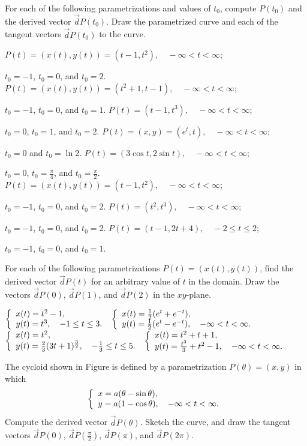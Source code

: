 \begin{exercises}

For each of the following parametrizations and
values of $t_0$, compute $P(t_0)$ and
the derived vector $\vec dP(t_0)$.  Draw
the parametrized curve and each of the
tangent vectors $\vec dP(t_0)$ to the curve.
\begin{exenum}
\x
$P(t) = (x(t),y(t)) = (t-1,t^2), \quad 
-\infty < t < \infty$;

$t_0 = -1$, $t_0 = 0$, and $t_0 = 2$.
\x
$P(t) = (x(t),y(t)) = (t^2+1,t-1), \quad 
-\infty < t < \infty$;

$t_0 = -1$, $t_0 = 0$, and $t_0 = 1$.
\x
$P(t) = (t-1,t^3), \quad 
-\infty < t < \infty$;

$t_0 = 0$, $t_0 = 1$, and $t_0 = 2$.
\x
$P(t) = (x,y) = (e^t,t), \quad 
-\infty < t < \infty$;

$t_0 = 0$ and $t_0 = \ln2$.
\x
$P(t) = (3\cos t,2\sin t), \quad 
-\infty < t < \infty$;

$t_0 = 0$, $t_0 = \frac\pi4$, and $t_0 = \frac\pi2$.
\x
$P(t) = (x(t),y(t)) = (t-1,t^2), \quad 
-\infty < t < \infty$;

$t_0 = -1$, $t_0 = 0$, and $t_0 = 2$.
\x
$P(t) = (t^2,t^3), \quad 
-\infty < t < \infty$;

$t_0 = -1$, $t_0 = 0$, and $t_0 = 2$.
\x
$P(t) = (t-1,2t+4), \quad 
-2 \leq t \leq 2$;

$t_0 = -1$, $t_0 = 0$, and $t_0 = 1$.
\end{exenum}

For each of the following parametrizations
$P(t) = (x(t),y(t))$, find the derived vector
$\vec dP(t)$ for an arbitrary value of $t$ in the
domain.  Draw the vectors $\vec dP(0)$,
$\vec dP(1)$, and $\vec dP(2)$ in the $xy$-plane.
\begin{exenum}
\x
$\left\{ \begin{array}{ll} x(t) = t^2-1, \\ y(t) = t^3, \quad -1\leq t \leq3. \end{array} \right.$
\x
$\left\{ \begin{array}{ll} x(t) = \frac12(e^t+e^{-t}), \\ y(t) = \frac12(e^t-e^{-t}), \quad
-\infty < t < \infty. \end{array} \right.$
\x
$\left\{ \begin{array}{ll} x(t) = t^2, \\ y(t) = \frac23(3t+1)^{\frac32}, \quad
-\frac13 \leq t \leq 5. \end{array} \right.$
\x
$\left\{ \begin{array}{ll} x(t) = t^2+t+1, \\ y(t) = \frac{t^3}3 + t^2 - 1, \quad
-\infty < t < \infty. \end{array} \right.$
\end{exenum}

The cycloid shown in Figure  is
defined by a parametrization $P(\theta) = (x,y)$
in which
\[
\left\{ \begin{array}{ll} x=a(\theta - \sin \theta), \\ y=a(1-\cos\theta), \quad
-\infty < t < \infty. \end{array} \right.
\]
Compute the derived vector $\vec dP(\theta)$.
Sketch the curve, and draw the tangent vectors
$\vec dP(0)$, $\vec dP\left(\frac\pi2\right)$,
$\vec dP(\pi)$, and $\vec dP(2\pi)$.


\end{exercises}
